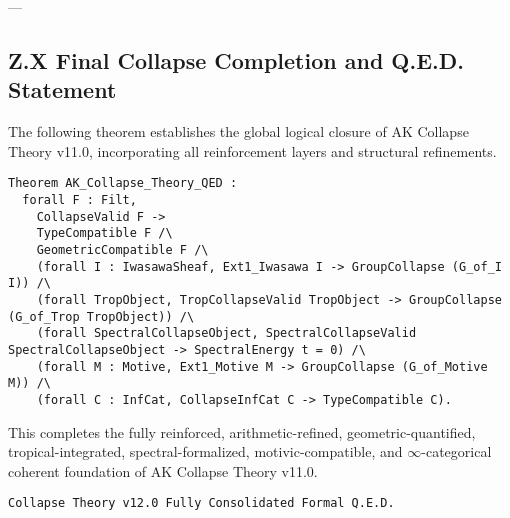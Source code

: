 \documentclass[11pt]{article}
\begin{document}
---


\subsection*{Z.X Final Collapse Completion and Q.E.D. Statement}

The following theorem establishes the global logical closure of AK Collapse Theory v11.0, incorporating all reinforcement layers and structural refinements.

\begin{lstlisting}[language=Coq]
Theorem AK_Collapse_Theory_QED :
  forall F : Filt,
    CollapseValid F ->
    TypeCompatible F /\
    GeometricCompatible F /\
    (forall I : IwasawaSheaf, Ext1_Iwasawa I -> GroupCollapse (G_of_I I)) /\
    (forall TropObject, TropCollapseValid TropObject -> GroupCollapse (G_of_Trop TropObject)) /\
    (forall SpectralCollapseObject, SpectralCollapseValid SpectralCollapseObject -> SpectralEnergy t = 0) /\
    (forall M : Motive, Ext1_Motive M -> GroupCollapse (G_of_Motive M)) /\
    (forall C : InfCat, CollapseInfCat C -> TypeCompatible C).
\end{lstlisting}

This completes the fully reinforced, arithmetic-refined, geometric-quantified, tropical-integrated, spectral-formalized, motivic-compatible, and $\infty$-categorical coherent foundation of AK Collapse Theory v11.0.

\begin{flushright}
\texttt{Collapse Theory v12.0 \quad Fully Consolidated \quad Formal Q.E.D.}
\end{flushright}
\end{document}
